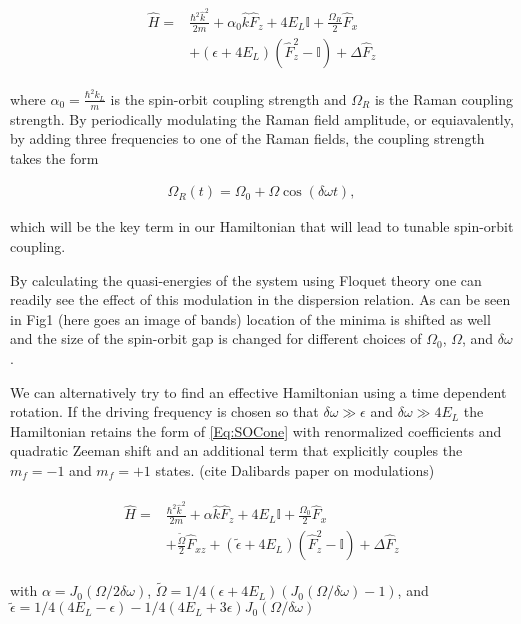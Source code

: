 \begin{align}
	\begin{split}
		\hat{H} = &\frac{\hbar^2\hat{k}^2}{2m} + \alpha_0\hat{k}\hat{F}_z +4E_L\mathbb{I} + \frac{\Omega_R}{2}\hat{F}_x\\
		& +(\epsilon+4E_L)(\hat{F}_z^2-\mathbb{I}) +\Delta\hat{F}_z 
		\label{Eq:SOCone}
	\end{split}
\end{align}	

where $\alpha_0=\frac{\hbar^2k_L}{m}$ is the spin-orbit coupling strength and $\Omega_R$ is the Raman coupling strength. By periodically modulating the Raman field amplitude, or equiavalently, by adding three frequencies to one of the Raman fields, the coupling strength takes the form

\begin{align}
	\Omega_R(t)=\Omega_0 + \Omega\cos(\delta\omega t),
	\label{Eq:Modulation}
\end{align}

 
which will be the key term in our Hamiltonian that will lead to tunable spin-orbit coupling. 	

By calculating the quasi-energies of the system using Floquet theory one can readily see the effect of this modulation in the dispersion relation. As can be seen in Fig1 (here goes an image of bands) location of the minima is shifted as well and the size of the spin-orbit gap is changed for different choices of $\Omega_0$, $\Omega$, and $\delta\omega$.  

 We can alternatively try to find an effective Hamiltonian using a time dependent rotation. If the driving frequency is chosen so that  $\delta\omega \gg \epsilon$ and $\delta\omega \gg 4E_L$ the Hamiltonian retains the form of \ref{Eq:SOCone} with renormalized coefficients and quadratic Zeeman shift and an additional term that explicitly couples the $m_f=-1$ and $m_f=+1$ states. (cite Dalibards paper on modulations)

\begin{align}
	\begin{split}
		\hat{H} = &\frac{\hbar^2\hat{k}^2}{2m} + \alpha\hat{k}\hat{F}_z +4E_L\mathbb{I} + \frac{\Omega_0}{2}\hat{F}_x \\
		&+ \frac{\tilde{\Omega}}{2}\hat{F}_{xz} +(\tilde{\epsilon}+4E_L)(\hat{F}_z^2-\mathbb{I}) +\Delta\hat{F}_z 
		\label{Eq:SOCeff}
	\end{split}
\end{align}	

with $\alpha= J_0(\Omega/2\delta\omega)$, $\tilde{\Omega}=1/4(\epsilon+4E_L) (J_0(\Omega/\delta\omega)-1)$, and $\tilde{\epsilon}= 1/4(4E_L-\epsilon) - 
1/4(4E_L + 3 \epsilon) J_0( \Omega/\delta\omega)$


